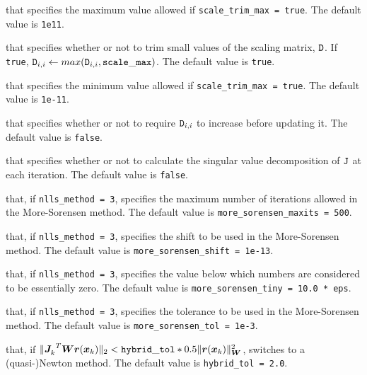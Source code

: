 \begin{description}
that specifies the maximum value allowed if {\tt scale\_trim\_max = true}.
The default value is {\tt 1e11}.

that specifies whether or not to trim small values of the scaling matrix, ${\tt D}$.
If {\tt true}, ${\tt D}_{i,i} \leftarrow max({\tt D}_{i,i}, {\tt scale\_max})$.
The default value is {\tt true}.

that specifies the minimum value allowed if {\tt scale\_trim\_max = true}.
The default value is {\tt 1e-11}.

that specifies whether or not to require ${\tt D}_{i,i}$ to increase before updating it.
The default value is {\tt false}.

that specifies whether or not to calculate the singular value decomposition of ${\tt J}$
at each iteration.  
The default value is {\tt false}.



that, if {\tt nlls\_method = 3}, specifies the maximum number of iterations allowed in the More-Sorensen method.
The default value is {\tt more\_sorensen\_maxits = 500}.

that, if {\tt nlls\_method = 3}, specifies the shift to be used in the More-Sorensen method.
The default value is {\tt more\_sorensen\_shift = 1e-13}.

that, if {\tt nlls\_method = 3}, specifies the value below which numbers are considered to be essentially zero.
The default value is {\tt more\_sorensen\_tiny = 10.0 * eps}.

that, if {\tt nlls\_method = 3}, specifies the tolerance to be used in the More-Sorensen method.
The default value is {\tt more\_sorensen\_tol = 1e-3}.

that, if \(\|{{\bm J}_{k}^{}}^T {\bm W} {\bm r}({\bm x}_k) \|_2 < \mathtt{hybrid\_tol} * 0.5 \|{\bm r}({\bm x}_k)\|_{\bm W}^2\), switches to a \newline(quasi-)Newton method.
The default value is {\tt hybrid\_tol = 2.0}.


\end{description}

